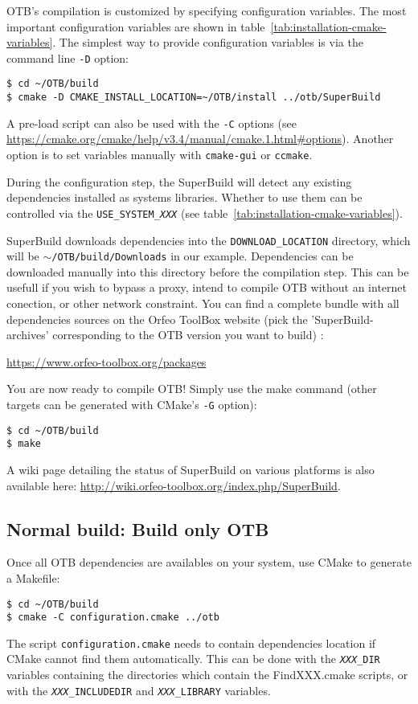 OTB's compilation is customized by specifying configuration variables.
The most important configuration variables are shown in table~\ref{tab:installation-cmake-variables}.
The simplest way to provide configuration variables is via the command line \texttt{-D} option:
\begin{verbatim}
$ cd ~/OTB/build
$ cmake -D CMAKE_INSTALL_LOCATION=~/OTB/install ../otb/SuperBuild
\end{verbatim}
A pre-load script can also be used with the \texttt{-C} options (see
\url{https://cmake.org/cmake/help/v3.4/manual/cmake.1.html#options}).
Another option is to set variables manually with \texttt{cmake-gui} or \texttt{ccmake}.

During the configuration step, the SuperBuild will detect any existing dependencies installed as systems libraries.
Whether to use them can be controlled via the \texttt{USE\_SYSTEM\_\textit{XXX}} (see
table~\ref{tab:installation-cmake-variables}).

SuperBuild downloads dependencies into the \texttt{DOWNLOAD\_LOCATION} directory, which will be
\texttt{$\sim$/OTB/build/Downloads} in our example.
Dependencies can be downloaded manually into this directory before the compilation step.
This can be usefull if you wish to bypass a proxy, intend to compile OTB without an internet conection, or other network
constraint. You can find a complete bundle with all dependencies sources on the Orfeo ToolBox website (pick the 'SuperBuild-archives' corresponding to the OTB version you want to build) :
\begin{center}
\url{https://www.orfeo-toolbox.org/packages}
\end{center}

You are now ready to compile OTB!
Simply use the make command (other targets can be generated with CMake's \texttt{-G} option):
\begin{verbatim}
$ cd ~/OTB/build
$ make
\end{verbatim}

A wiki page detailing the status of SuperBuild on various platforms is also available here:
\url{http://wiki.orfeo-toolbox.org/index.php/SuperBuild}.

\subsection{Normal build: Build only OTB}
\label{sec:installation-linux-normalbuild}

Once all OTB dependencies are availables on your system, use CMake to generate a Makefile:
\begin{verbatim}
$ cd ~/OTB/build
$ cmake -C configuration.cmake ../otb
\end{verbatim}
The script \texttt{configuration.cmake} needs to contain dependencies location if CMake cannot find them automatically.
This can be done with the \texttt{\textit{XXX}\_DIR} variables containing the directories which contain the
FindXXX.cmake scripts, or with the \texttt{\textit{XXX}\_INCLUDEDIR} and \texttt{\textit{XXX}\_LIBRARY} variables.

